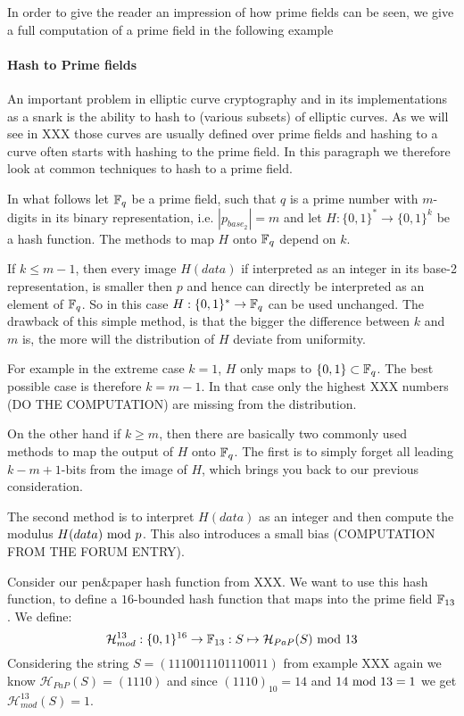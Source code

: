 In order to give the reader an impression of how prime fields can be seen, we give a full computation of a prime field in the following example


\paragraph{Hash to Prime fields} 
An important problem in elliptic curve cryptography and in its implementations as a snark is the ability to hash to (various subsets) of elliptic curves. As we will see in XXX those curves are usually defined over prime fields and hashing to a curve often starts with hashing to the prime field. In this paragraph we therefore look at common techniques to hash to a prime field.

In what follows let $\mathbb{F}_{q}$ be a prime field, such that $q$ is a prime number with $m$-digits in its binary representation, i.e. $|p_{base_2}|=m$ and let $H:\{0,1\}^* \to \{0,1\}^k$ be a hash function. The methods to map $H$ onto $\mathbb{F}_{q}$ depend on $k$. 

If $k\leq m-1$, then every image $H(data)$ if interpreted as an integer in its base-2 representation, is smaller then $p$ and hence can directly be interpreted as an element of $\mathbb{F}_{q}$. So in this case $H:\{0,1\}^* \to \mathbb{F}_q$ can be used unchanged. The drawback of this simple method, is that the bigger the difference between $k$ and $m$ is, the more will the distribution of $H$ deviate from uniformity.

For example in the extreme case $k=1$, $H$ only maps to $\{0,1\}\subset \mathbb{F}_q$. The best possible case is therefore $k=m-1$. In that case only the highest XXX numbers (DO THE COMPUTATION) are missing from the distribution.

On the other hand if $k\geq m$, then there are basically two commonly used methods to map the output of $H$ onto $\mathbb{F}_q$. The first is to simply forget all leading $k-m+1$-bits from the image of $H$, which brings you back to our previous consideration.

The second method is to interpret $H(data)$ as an integer and then compute the modulus $ H(data) \text{ mod } p$. This also introduces a small bias (COMPUTATION FROM THE FORUM ENTRY). 

\begin{example}
Consider our pen\&paper hash function from XXX. We want to use this hash function, to define a $16$-bounded hash function that maps into the prime field $\mathbb{F}_{13}$. We define:
$$
\mathcal{H}_{mod}^{13}: \{0,1\}^{16}\to \mathbb{F}_{13}: S \mapsto \mathcal{H}_{PaP}(S) \text{ mod } 13
$$
Considering the string $S=(1110011101110011)$ from example XXX again we know $\mathcal{H}_{PaP}(S)=(1110)$ and since $(1110)_{10}=14$ and $14 \text{ mod } 13=1$ we get $\mathcal{H}_{mod}^{13}(S)=1$.
\end{example}

